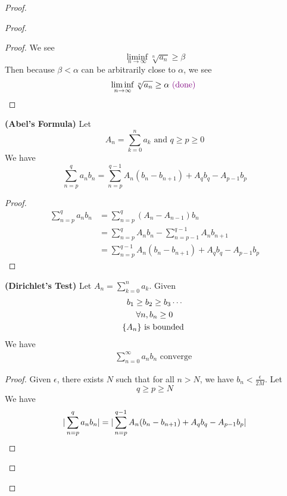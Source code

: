 \documentclass{report}
\begin{document}
\begin{proof}
\begin{proof}
\begin{proof}
We see
\begin{equation}
\liminf_{n\to\infty} \sqrt[n]{a_n} \geq \beta 
\end{equation}
Then because $\beta<\alpha $ can be arbitrarily close to $\alpha $, we see
\begin{equation}
\liminf_{n\to\infty} \sqrt[n]{a_n}  \geq \alpha \textcolor{violet}{\text{ (done) }}
\end{equation}
\end{proof}
\begin{lemma}
\label{4.5.4}
\textbf{(Abel's Formula)} Let
\begin{equation}
A_n=\sum_{k=0}^n a_k\text{ and }q\geq p \geq 0
\end{equation}
We have
\begin{equation}
\sum_{n=p}^q a_nb_n=\sum_{n=p}^{q-1}A_n(b_n-b_{n+1})+A_qb_q-A_{p-1}b_p
\end{equation}
\end{lemma}
\begin{proof}
\begin{align}
  \sum_{n=p}^q a_nb_n&=\sum_{n=p}^q (A_{n}-A_{n-1})b_n\\
  &=\sum_{n=p}^q A_nb_n-\sum_{n=p-1}^{q-1}A_nb_{n+1}\\
  &=\sum_{n=p}^{q-1}A_n(b_n-b_{n+1})+A_qb_q-A_{p-1}b_p
\end{align}
\end{proof}
\begin{theorem}
\label{4.5.5}
\textbf{(Dirichlet's Test)} 
Let $A_n=\sum_{k=0}^n a_k$. Given
\begin{gather}
b_1\geq b_2\geq b_3\cdots\\
\forall n, b_n\geq 0\\
\{ A_n \}\text{ is bounded  }
\end{gather}
We have
\begin{gather}
\sum_{n=0}^\infty a_nb_n\text{ converge }
\end{gather}
\end{theorem}
\begin{proof}
Given $\epsilon $, there exists $N$ such that for all $n>N$, we have  $b_n<\frac{\epsilon }{2M}$. Let 
\begin{equation}
q\geq p\geq N
\end{equation}
We have
\begin{align}
\abso{\sum_{n=p}^q a_nb_n}&=\abso{\sum_{n=p}^{q-1}A_n(b_n-b_{n+1})+A_qb_q-A_{p-1}b_p}\\

\end{align}
\end{proof}
\end{proof}
\end{proof}
\end{document}
